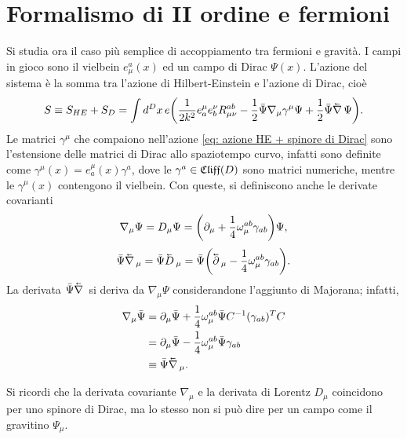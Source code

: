 \section{Formalismo di II ordine e fermioni}
Si studia ora il caso più semplice di accoppiamento tra fermioni e gravità. I campi in gioco sono il vielbein $e^a_\mu(x)$ ed un campo di Dirac $\Psi(x)$. L'azione del sistema è la somma tra l'azione di Hilbert-Einstein e l'azione di Dirac, cioè
\begin{equation}
\label{eq: azione HE + spinore di Dirac}
    S \equiv S_{HE} + S_D = \int d^Dx\,e\bigg(\frac{1}{2k^2}e_a^{\mu}e_b^{\nu}R_{\mu\nu}^{ab} - \frac{1}{2}\b{\Psi}\nabla_\mu\gamma^\mu\Psi + \frac{1}{2}\b{\Psi}\leftcd\Psi\bigg).
\end{equation}
Le matrici $\gamma^\mu$ che compaiono nell'azione \eqref{eq: azione HE + spinore di Dirac} sono l'estensione delle matrici di Dirac allo spaziotempo curvo, infatti sono definite come $\gamma^\mu(x) = e^\mu_a(x)\gamma^a$, dove le $\gamma^a \in \mathfrak{Cliff}(D)$ sono matrici numeriche, mentre le $\gamma^\mu(x)$ contengono il vielbein. Con queste, si definiscono anche le derivate covarianti 
\begin{equation}
\label{eq: derivata covariante spinore di Dirac}
    \nabla_\mu\Psi = D_\mu\Psi = \bigg(\partial_\mu + \frac{1}{4}\omega_\mu^{ab}\gamma_{ab}\bigg)\Psi,
\end{equation}
\begin{equation}
    \b{\Psi}\leftcd_\mu = \b{\Psi}\leftLd_\mu = \b{\Psi}\bigg(\leftd_\mu - \frac{1}{4}\omega_\mu^{ab}\gamma_{ab}\bigg).
\end{equation}
La derivata $\b{\Psi}\leftcd$ si deriva da $\nabla_\mu\Psi$ considerandone l'aggiunto di Majorana; infatti,
\begin{equation}
\label{eq: derivata covariante sinistra spinore di Dirac}
    \begin{split}
        \nabla_\mu\b{\Psi} &= \p_\mu\b{\Psi} + \frac{1}{4}\omega_\mu^{ab}\b{\Psi}C^{-1}(\gamma_{ab})^TC \\
        &= \p_\mu\b{\Psi} - \frac{1}{4}\omega_\mu^{ab}\b{\Psi}\gamma_{ab} \\
        &\equiv \b{\Psi}\leftcd_\mu.
    \end{split}
\end{equation}
\begin{obs}
    Si ricordi che la derivata covariante $\nabla_\mu$ e la derivata di Lorentz $D_\mu$ coincidono per uno spinore di Dirac, ma lo stesso non si può dire per un campo come il gravitino $\Psi_\mu$.
\end{obs}
